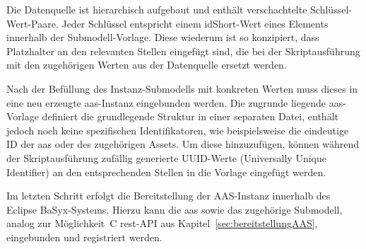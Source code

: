 Die Datenquelle ist hierarchisch aufgebaut und enthält verschachtelte Schlüssel-Wert-Paare. 
Jeder Schlüssel entspricht einem idShort-Wert eines Elements innerhalb der Submodell-Vorlage. 
Diese wiederum ist so konzipiert, dass Platzhalter an den relevanten Stellen eingefügt sind, die bei der Skriptausführung mit den zugehörigen Werten aus der Datenquelle ersetzt werden.

Nach der Befüllung des Instanz-Submodells mit konkreten Werten muss dieses in eine neu erzeugte \acs{aas}-Instanz eingebunden werden.
Die zugrunde liegende \acs{aas}-Vorlage definiert die grundlegende Struktur in einer separaten Datei, enthält jedoch noch keine spezifischen Identifikatoren, wie beispielsweise die eindeutige ID der \acs{aas} oder des zugehörigen Assets.
Um diese hinzuzufügen, können während der Skriptausführung zufällig generierte UUID-Werte (Universally Unique Identifier) an den entsprechenden Stellen in die Vorlage eingefügt werden.

Im letzten Schritt erfolgt die Bereitstellung der AAS-Instanz innerhalb des Eclipse BaSyx-Systems. 
Hierzu kann die \acs{aas} sowie das zugehörige Submodell, analog zur Möglichkeit~C \acs{rest}-API aus Kapitel~\ref{sec:bereitstellungAAS}, eingebunden und registriert werden.
